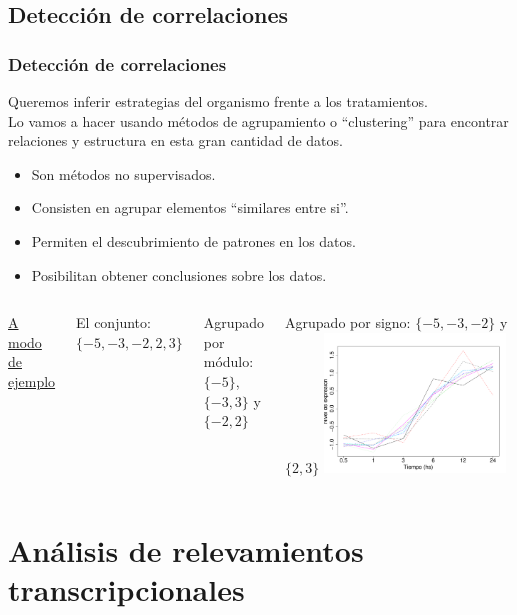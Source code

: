 \documentclass[serif,9pt, t]{beamer}
\newcommand\Fontvi{\fontsize{7}{7.2}\selectfont}
\begin{document}
\subsection{Detección de correlaciones}
\begin{frame}\frametitle{Detección de correlaciones} 
\large
Queremos inferir estrategias del organismo frente a los tratamientos.\\\bigskip
Lo vamos a hacer usando métodos de agrupamiento o ``clustering'' para encontrar relaciones y estructura en esta gran cantidad de datos.\medskip
\normalsize
\begin{itemize}
\item Son métodos no supervisados.
\item Consisten en agrupar elementos ``similares entre si''.
\item Permiten el descubrimiento de patrones en los datos.
\item Posibilitan obtener conclusiones sobre los datos.
\end{itemize}
\bigskip
\begin{columns}[T]
		\Fontvi
		\underline{A modo de ejemplo}\medskip

		El conjunto: $\{-5, -3, -2, 2, 3\}$\medskip

		Agrupado por módulo: $\{-5\}$, $\{-3, 3\}$ y $\{-2, 2\}$\medskip

		Agrupado por signo: $\{-5, -3, -2\}$ y $\{2, 3\}$
	\includegraphics[width=0.8\textwidth]{perfiles_coregulados.pdf}
\end{columns}
\end{frame}

\section{Análisis de relevamientos transcripcionales}
\end{document}
